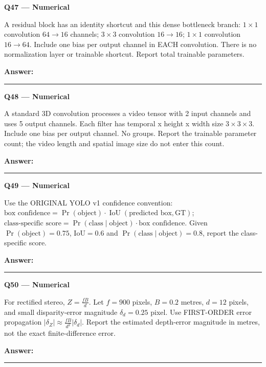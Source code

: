 \documentclass[11pt,a4paper]{article}
\begin{document}
\begin{minipage}{\linewidth}
\textbf{Q47 — Numerical}\par\smallskip
A residual block has an identity shortcut and this dense bottleneck branch: \(1\times1\) convolution \(64\to16\) channels; \(3\times3\) convolution \(16\to16\); \(1\times1\) convolution \(16\to64\). Include one bias per output channel in EACH convolution. There is no normalization layer or trainable shortcut. Report total trainable parameters.
\par\medskip\textbf{Answer:} \rule{55mm}{0.4pt}
\end{minipage}
\par\vspace{12pt}
\begin{minipage}{\linewidth}
\textbf{Q48 — Numerical}\par\smallskip
A standard 3D convolution processes a video tensor with 2 input channels and uses 5 output channels. Each filter has temporal x height x width size \(3\times3\times3\). Include one bias per output channel. No groups. Report the trainable parameter count; the video length and spatial image size do not enter this count.
\par\medskip\textbf{Answer:} \rule{55mm}{0.4pt}
\end{minipage}
\par\vspace{12pt}
\begin{minipage}{\linewidth}
\textbf{Q49 — Numerical}\par\smallskip
Use the ORIGINAL YOLO v1 confidence convention: \(\text{box confidence}=\Pr(\text{object})\cdot\operatorname{IoU}(\text{predicted box},\mathrm{GT})\); \(\text{class-specific score}=\Pr(\text{class}\mid\text{object})\cdot\text{box confidence}\). Given \(\Pr(\text{object})=0.75\),\allowbreak{} \(\mathrm{IoU}=0.6\) and \(\Pr(\text{class}\mid\text{object})=0.8\),\allowbreak{} report the class-specific score.
\par\medskip\textbf{Answer:} \rule{55mm}{0.4pt}
\end{minipage}
\par\vspace{12pt}
\begin{minipage}{\linewidth}
\textbf{Q50 — Numerical}\par\smallskip
For rectified stereo,\allowbreak{} \(Z=\frac{fB}{d}\). Let \(f=900\) pixels,\allowbreak{} \(B=0.2\) metres,\allowbreak{} \(d=12\) pixels,\allowbreak{} and small disparity-error magnitude \(\delta_d=0.25\) pixel. Use FIRST-ORDER error propagation \(\lvert\delta_Z\rvert\approx\frac{fB}{d^2}\lvert\delta_d\rvert\). Report the estimated depth-error magnitude in metres,\allowbreak{} not the exact finite-difference error.
\par\medskip\textbf{Answer:} \rule{55mm}{0.4pt}
\end{minipage}
\par\vspace{12pt}
\end{document}
